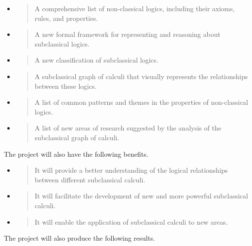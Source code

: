 \begin{itemize}
\item
  \begin{quote}
  A comprehensive list of non-classical logics, including their axioms,
  rules, and properties.
  \end{quote}
\item
  \begin{quote}
  A new formal framework for representing and reasoning about
  subclassical logics.
  \end{quote}
\item
  \begin{quote}
  A new classification of subclassical logics.
  \end{quote}
\item
  \begin{quote}
  A subclassical graph of calculi that visually represents the
  relationships between these logics.
  \end{quote}
\item
  \begin{quote}
  A list of common patterns and themes in the properties of
  non-classical logics.
  \end{quote}
\item
  \begin{quote}
  A list of new areas of research suggested by the analysis of the
  subclassical graph of calculi.
  \end{quote}
\end{itemize}

The project will also have the following benefits.

\begin{itemize}
\item
  \begin{quote}
  It will provide a better understanding of the logical relationships
  between different subclassical calculi.
  \end{quote}
\item
  \begin{quote}
  It will facilitate the development of new and more powerful
  subclassical calculi.
  \end{quote}
\item
  \begin{quote}
  It will enable the application of subclassical calculi to new areas.
  \end{quote}
\end{itemize}

The project will also produce the following results.

